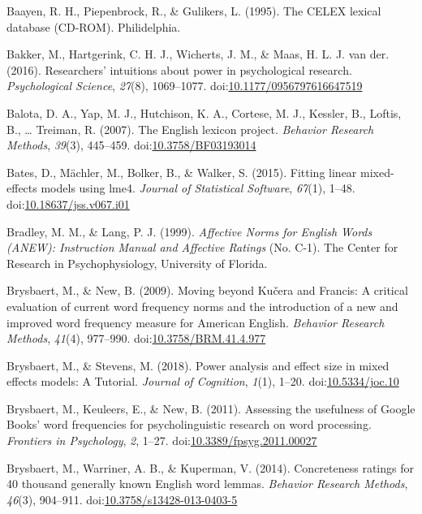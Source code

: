\documentclass[english,man]{apa6}
\theoremstyle{definition}
\theoremstyle{definition}
\theoremstyle{definition}
\theoremstyle{remark}
\begin{document}
\hypertarget{ref-Baayen1995}{}
Baayen, R. H., Piepenbrock, R., \& Gulikers, L. (1995). The CELEX
lexical database (CD-ROM). Philidelphia.

\hypertarget{ref-Bakker2016}{}
Bakker, M., Hartgerink, C. H. J., Wicherts, J. M., \& Maas, H. L. J. van
der. (2016). Researchers' intuitions about power in psychological
research. \emph{Psychological Science}, \emph{27}(8), 1069--1077.
doi:\href{https://doi.org/10.1177/0956797616647519}{10.1177/0956797616647519}

\hypertarget{ref-Balota2007}{}
Balota, D. A., Yap, M. J., Hutchison, K. A., Cortese, M. J., Kessler,
B., Loftis, B., \ldots{} Treiman, R. (2007). The English lexicon
project. \emph{Behavior Research Methods}, \emph{39}(3), 445--459.
doi:\href{https://doi.org/10.3758/BF03193014}{10.3758/BF03193014}

\hypertarget{ref-Bates2015}{}
Bates, D., Mächler, M., Bolker, B., \& Walker, S. (2015). Fitting linear
mixed-effects models using lme4. \emph{Journal of Statistical Software},
\emph{67}(1), 1--48.
doi:\href{https://doi.org/10.18637/jss.v067.i01}{10.18637/jss.v067.i01}

\hypertarget{ref-Bradley1999}{}
Bradley, M. M., \& Lang, P. J. (1999). \emph{Affective Norms for English
Words (ANEW): Instruction Manual and Affective Ratings} (No. C-1). The
Center for Research in Psychophysiology, University of Florida.

\hypertarget{ref-Brysbaert2009}{}
Brysbaert, M., \& New, B. (2009). Moving beyond Kučera and Francis: A
critical evaluation of current word frequency norms and the introduction
of a new and improved word frequency measure for American English.
\emph{Behavior Research Methods}, \emph{41}(4), 977--990.
doi:\href{https://doi.org/10.3758/BRM.41.4.977}{10.3758/BRM.41.4.977}

\hypertarget{ref-Brysbaert2018}{}
Brysbaert, M., \& Stevens, M. (2018). Power analysis and effect size in
mixed effects models: A Tutorial. \emph{Journal of Cognition},
\emph{1}(1), 1--20.
doi:\href{https://doi.org/10.5334/joc.10}{10.5334/joc.10}

\hypertarget{ref-Brysbaert2011}{}
Brysbaert, M., Keuleers, E., \& New, B. (2011). Assessing the usefulness
of Google Books' word frequencies for psycholinguistic research on word
processing. \emph{Frontiers in Psychology}, \emph{2}, 1--27.
doi:\href{https://doi.org/10.3389/fpsyg.2011.00027}{10.3389/fpsyg.2011.00027}

\hypertarget{ref-Brysbaert2013}{}
Brysbaert, M., Warriner, A. B., \& Kuperman, V. (2014). Concreteness
ratings for 40 thousand generally known English word lemmas.
\emph{Behavior Research Methods}, \emph{46}(3), 904--911.
doi:\href{https://doi.org/10.3758/s13428-013-0403-5}{10.3758/s13428-013-0403-5}
\end{document}
